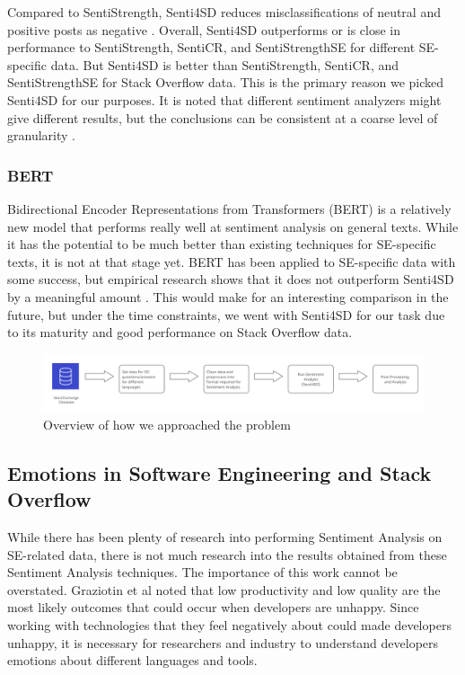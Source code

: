 \documentclass[conference]{IEEEtran}
\begin{document}
Compared to SentiStrength, Senti4SD reduces misclassifications of neutral and positive posts as negative \cite{b21}. Overall, Senti4SD outperforms or is close in performance to SentiStrength, SentiCR, and SentiStrengthSE for different SE-specific data\cite{b21, b26}. But Senti4SD is better than SentiStrength, SentiCR, and SentiStrengthSE for Stack Overflow data. This is the primary reason we picked Senti4SD for our purposes. It is noted that different sentiment analyzers might give different results, but the conclusions can be consistent at a coarse level of granularity \cite{b26}.\\

\subsubsection{BERT}
Bidirectional Encoder Representations from Transformers (BERT) is a relatively new model that performs really well at sentiment analysis on general texts\cite{b27}. While it has the potential to be much better than existing techniques for SE-specific texts, it is not at that stage yet. BERT has been applied to SE-specific data with some success\cite{b22}, but empirical research shows that it does not outperform Senti4SD by a meaningful amount \cite{b26}. This would make for an interesting comparison in the future, but under the time constraints, we went with Senti4SD for our task due to its maturity and good performance on Stack Overflow data. \\

\begin{figure}[tbp]
\centering
\includegraphics[width=\textwidth]{figures/4710_method_summary.png}
\caption{Overview of how we approached the problem}
\label{fig}
\end{figure}

\subsection{Emotions in Software Engineering and Stack Overflow}
While there has been plenty of research into performing Sentiment Analysis on SE-related data, there is not much research into the results obtained from these Sentiment Analysis techniques. The importance of this work cannot be overstated. Graziotin et al \cite{b38} noted that low productivity and low quality are the most likely outcomes that could occur when developers are unhappy. Since working with technologies that they feel negatively about could made developers unhappy, it is necessary for researchers and industry to understand developers emotions about different languages and tools. \\
\end{document}
